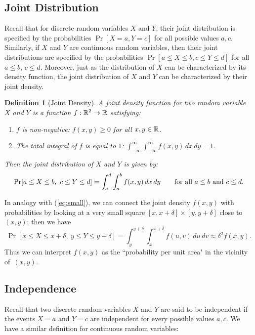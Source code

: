 \documentclass[11pt]{article}
\newcounter{thm}
\newtheorem{definition}{Definition}[thm]
\begin{document}
\subsection*{Joint Distribution}

Recall that for discrete random variables $X$ and $Y$, their joint
distribution is specified by the probabilities $\Pr[X = a, Y = c]$ for 
all possible values $a,c$. Similarly, if $X$ and $Y$ are continuous
random variables, then their joint distributions are specified by
the probabilities $\Pr[a \le X \le b, c \le Y \le d]$ for all $a \le b$, $c \le d$.
Moreover, just as the distribution of $X$ can be characterized
by its density function, the joint distribution of $X$ and $Y$ can be
characterized by their joint density.

\begin{definition}[Joint Density]
A {\em joint density function} for two random variable~$X$ and $Y$
is a function $f:\mathbb{R}^2\to\mathbb{R}$ satisfying:
\begin{enumerate}
  \item $f$ is non-negative: $f(x,y) \ge 0$ for all $x,y \in \mathbb{R}$.
  \item The total integral of $f$ is equal to $1$: $\int_{-\infty}^\infty \int_{-\infty}^\infty f(x,y) \, dx \, dy = 1$.
\end{enumerate}
Then the joint distribution of $X$ and $Y$ is given by:
 $$ \Pr[a\le X\le b, ~ c \le Y \le d] = \int_{c}^d \int_a^b f(x,y) \, dx \, dy\qquad\hbox{\rm for all $a\le b$ and $c \le d$}.  $$
\end{definition}


In analogy with
(\ref{eq:small}), we can connect the joint density $f(x,y)$ with probabilities by
looking at a very small square $[x,x+\delta] \times [y,y+\delta]$
close to~$(x,y)$; then we have
\begin{equation}
\label{eq:small_joint}
   \Pr[x\le X\le x+\delta, ~ y \le Y \le y +\delta]
= \int_y^{y+\delta}\int_{x}^{x+\delta} f(u,v) \, du \, dv \approx \delta^2
f(x,y).
\end{equation}
Thus we can interpret $f(x,y)$ as the ``probability per unit area"
in the vicinity of~$(x,y)$.

\subsection*{Independence}

Recall that two discrete random variables $X$ and $Y$ are said
to be independent if the events $X=a$ and $Y=c$ are
independent for every possible values $a,c$. We have a similar definition
for continuous random variables:
\end{document}
